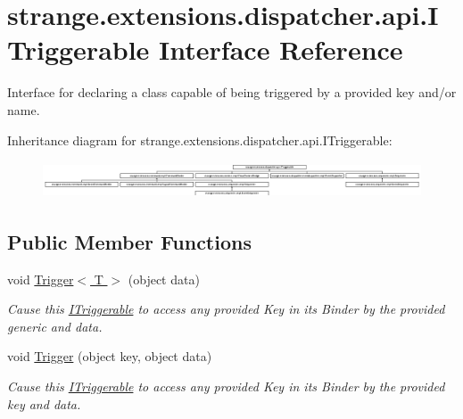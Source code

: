 \hypertarget{interfacestrange_1_1extensions_1_1dispatcher_1_1api_1_1_i_triggerable}{\section{strange.\-extensions.\-dispatcher.\-api.\-I\-Triggerable Interface Reference}
\label{interfacestrange_1_1extensions_1_1dispatcher_1_1api_1_1_i_triggerable}
}


Interface for declaring a class capable of being triggered by a provided key and/or name.  


Inheritance diagram for strange.\-extensions.\-dispatcher.\-api.\-I\-Triggerable\-:\begin{figure}[H]
\begin{center}
\leavevmode
\includegraphics[height=1.106173cm]{interfacestrange_1_1extensions_1_1dispatcher_1_1api_1_1_i_triggerable}
\end{center}
\end{figure}
\subsection*{Public Member Functions}
\begin{DoxyCompactItemize}
\item 
\hypertarget{interfacestrange_1_1extensions_1_1dispatcher_1_1api_1_1_i_triggerable_af2d6a85b1e00a06bab56f21add189549}{void \hyperlink{interfacestrange_1_1extensions_1_1dispatcher_1_1api_1_1_i_triggerable_af2d6a85b1e00a06bab56f21add189549}{Trigger$<$ T $>$} (object data)}\label{interfacestrange_1_1extensions_1_1dispatcher_1_1api_1_1_i_triggerable_af2d6a85b1e00a06bab56f21add189549}

\begin{DoxyCompactList}\small\item\em Cause this \hyperlink{interfacestrange_1_1extensions_1_1dispatcher_1_1api_1_1_i_triggerable}{I\-Triggerable} to access any provided Key in its Binder by the provided generic and data. \end{DoxyCompactList}\item 
\hypertarget{interfacestrange_1_1extensions_1_1dispatcher_1_1api_1_1_i_triggerable_a361da017a6fcf4462bf05089cbfa6304}{void \hyperlink{interfacestrange_1_1extensions_1_1dispatcher_1_1api_1_1_i_triggerable_a361da017a6fcf4462bf05089cbfa6304}{Trigger} (object key, object data)}\label{interfacestrange_1_1extensions_1_1dispatcher_1_1api_1_1_i_triggerable_a361da017a6fcf4462bf05089cbfa6304}

\begin{DoxyCompactList}\small\item\em Cause this \hyperlink{interfacestrange_1_1extensions_1_1dispatcher_1_1api_1_1_i_triggerable}{I\-Triggerable} to access any provided Key in its Binder by the provided key and data. \end{DoxyCompactList}\end{DoxyCompactItemize}


